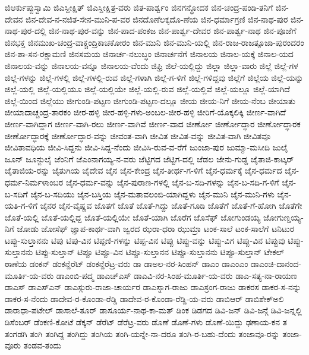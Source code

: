 {ಜಿಆರ್ಕುಪ್ಪುಸ್ವಾಮಿ
ಜಿಎಸ್ದೀಕ್ಷಿತ್
ಜಿಎಸ್ದೀಕ್ಷಿತ್ರ-ವರು
ಜಿತ-ಪಾರ್ಶ್ವಂ
ಜಿನಗನ್ಧೋದಕ
ಜಿನ-ಚಂದ್ರ-ಪಂಡಿ-ತನಿಗೆ
ಜಿನ-ದೇವನ
ಜಿನ-ದೇವ-ನ-ನಜಿತ-ಸೇನ-ಮುನಿ-ಪ-ವರ
ಜಿನದೊಣೆಲಕ್ಕದೊ-ಣೆಯ
ಜಿನ-ಧರ್ಮಾಗ್ರಣಿ
ಜಿನ-ನಾಥ-ಪುರ
ಜಿನ-ನಾಥ-ಪುರ-ದಲ್ಲಿ
ಜಿನ-ನಾಥ-ಪುರ-ವನ್ನು
ಜಿನ-ಪಾದ-ಪಂಕಜ
ಜಿನ-ಪಾರ್ಶ್ವ-ದೇವರ
ಜಿನ-ಪಾರ್ಶ್ವ-ನಾಥ
ಜಿನ-ಪೂಜೆಗೆ
ಜಿನಭಕ್ತ
ಜಿನಮುಖ-ಚಂದ್ರ-ವಾಕ್ಚಂದ್ರಿಕಾಚಕೋರಂ
ಜಿನ-ಮುನಿ
ಜಿನ-ಮುನಿ-ಯಲ್ಲಿ
ಜಿನ-ರಾಜ-ರಾಜತ್ಪೂಜಾ-ಪುರಂದರಂ
ಜಿನ-ಶಾ-ಸನ-ರಕ್ಷಾಮಣಿ
ಜಿನಸಮಯ
ಜಿನಾರ್ಚ-ನಲುಬ್ಧಂ
ಜಿನಾರ್ಚನೆಗೆ
ಜಿನಾಲಯ
ಜಿನಾಲ-ಯಕ್ಕೆ
ಜಿನಾಲ-ಯದ
ಜಿನಾಲಯ-ವನ್ನು
ಜಿನಾಲಯ-ವನ್ನೂ
ಜಿನಾಲಯ-ವೆಂದು
ಜಿಫ್ರಿ
ಜಿಲೆ-ಯಲ್ಲಿದ್ದು
ಜಿಲ್ಲಾ
ಜಿಲ್ಲಾ-ವಾರು
ಜಿಲ್ಲೆ
ಜಿಲ್ಲೆ-ಗಳ
ಜಿಲ್ಲೆ-ಗಳನ್ನು
ಜಿಲ್ಲೆ-ಗಳಲ್ಲಿ
ಜಿಲ್ಲೆ-ಗಳಲ್ಲಿ-ರುವ
ಜಿಲ್ಲೆ-ಗಳಾಗಿ
ಜಿಲ್ಲೆ-ಗ-ಳಿಗೆ
ಜಿಲ್ಲೆ-ಗಳಿದ್ದವು
ಜಿಲ್ಲೆಗೆ
ಜಿಲ್ಲೆಯ
ಜಿಲ್ಲೆ-ಯನ್ನು
ಜಿಲ್ಲೆ-ಯಲ್ಲಿ
ಜಿಲ್ಲೆ-ಯಲ್ಲಿಯೂ
ಜಿಲ್ಲೆ-ಯಲ್ಲಿಯೇ
ಜಿಲ್ಲೆ-ಯಲ್ಲಿ-ರುವ
ಜಿಲ್ಲೆ-ಯಲ್ಲಿವೆ
ಜಿಲ್ಲೆ-ಯಲ್ಲೂ
ಜಿಲ್ಲೆ-ಯಾಗಿದೆ
ಜಿಲ್ಲೆ-ಯಿಂದ
ಜಿಲ್ಲೆಯು
ಜೀಗುಂಡಿ-ಪಟ್ಟಣ
ಜೀಗುಂಡಿ-ಪಟ್ಟಣ-ದಲ್ಲೂ
ಜೀಯ
ಜೀಯ-ನಿಗೆ
ಜೀಯ-ನೆಂಬ
ಜೀಯಾತು
ಜೀಯಾದಾಚ್ಚಂದ್ರ-ತಾರಕಂ
ಜೀರ-ಹಳ್ಳಿ
ಜೀರ-ಹಳ್ಳಿ-ಗಳು-ಅಂಬಲ-ಜೀರ-ಹಳ್ಳಿ
ಜೀರಿಗೆ-ಯೊಕ್ಕಲಿಕ್ಕಿ
ಜೀರ್ಣ-ವಾಗಿದೆ
ಜೀರ್ಣ-ವಾಗಿದ್ದಾಗ
ಜೀರ್ಣ-ವಾಗಿ-ರಲು
ಜೀರ್ಣ-ವಾಗಿವೆ
ಜೀರ್ಣ-ವಾದ
ಜೀರ್ಣೋ
ಜೀರ್ಣೋದ್ಧಾರ
ಜೀರ್ಣೋದ್ಧಾರಕ
ಜೀರ್ಣೋದ್ಧಾರಕ್ಕೆ
ಜೀರ್ಣೋದ್ಧಾರ-ವನ್ನು
ಜೀವಂತ-ವಾಗಿ
ಜೀವಿತ
ಜೀವಿತ-ವನ್ನು
ಜೀವಿತ-ವಾಗಿ
ಜೀವಿತವೂ
ಜೀವಿತಾವಧಿಯ
ಜೀವಿ-ಸಿದ್ದನು
ಜೀವಿ-ಸಿದ್ದ-ನೆಂದು
ಜೀವಿಸಿ-ರುವ-ವ-ರೆಗೆ
ಜುಂಜಾ-ಪುರ
ಜುಮ್ಮಾ-ಮಸೀದಿ
ಜುಲೈ
ಜೂನ್
ಜೂನ್ಜುಲೈ
ಜೆಂನಿಗೆ
ಜೆಎಂನಾಗಯ್ಯ-ನ-ವರು
ಜೆಟ್ಟಿಗದ
ಜೆಟ್ಟಿಗ-ದಲ್ಲಿ
ಜೆಡಲ
ಜೇನು-ಗುಡ್ಡ
ಜೈತಾಜಿ-ಕಾಟ್ಕರ್
ಜೈತಾಜಿಯ-ರನ್ನು
ಜೈತುಗಿಯ
ಜೈದೇವ
ಜೈನ
ಜೈನ-ಕೇಂದ್ರ
ಜೈನ-ತೀರ್ಥ-ಗ-ಳಿಗೆ
ಜೈನ-ಧರ್ಮಕ್ಕೆ
ಜೈನ-ಧರ್ಮದ
ಜೈನ-ಧರ್ಮ-ನಿರ್ಮಳಾಂಬರ
ಜೈನ-ಧರ್ಮ-ವನ್ನು
ಜೈನ-ಪುರಾಣ-ಗಳಲ್ಲಿ
ಜೈನ-ಬ-ಸದಿ-ಗಳನ್ನು
ಜೈನ-ಬ-ಸದಿ-ಗ-ಳಿಗೆ
ಜೈನ-ಬ-ಸದಿಗೆ
ಜೈನ-ಬ-ಸದಿಯು
ಜೈನ-ಬಸ್ತಿಯ
ಜೈನ-ಮತಾವಲಂಬಿ-ಯಾಗಿದ್ದಳು
ಜೈನ-ಮುನಿ
ಜೈನ-ಮುನಿ-ಗಳು
ಜೈನ-ಯತಿ-ಗ-ಳಿಗೆ
ಜೈನರ
ಜೈನ-ವೈಷ್ಣವ
ಜೊತಗೆ
ಜೊತೆ
ಜೊತೆ-ಗಿದ್ದು
ಜೊತೆ-ಗೂಡಿ
ಜೊತೆಗೆ
ಜೊತೆ-ಗೆ-ಹೋಗಿ
ಜೊತೆಗೇ
ಜೊತೆ-ಯಲ್ಲಿ
ಜೊತೆ-ಯಲ್ಲಿದ್ದ
ಜೊತೆ-ಯಲ್ಲಿಯೇ
ಜೊತೆ-ಯಾಗಿ
ಜೊರೆಗ
ಜೊಸೆಫ್
ಜೋಗುಂಡಯ್ಯ
ಜೋಗುಣ್ಡಯ್ಯ-ನಿಗೆ
ಜೋಡು
ಜೋಸೆಫ್
ಜ್ಞಾಪ-ಕಾರ್ಥ-ವಾಗಿ
ಜ್ವರದ
ಝರಾ-ಧರಾ
ಝುಮ್ರಾ
ಟಂಕ-ಸಾಲೆ
ಟಂಕ-ಸಾಲೆಗೆ
ಟನಿಟುರ
ಟಪ್ಪು-ಸುಲ್ತಾನನು
ಟಿಪು
ಟಿಪು-ವಿನ
ಟಿಪ್ಪಣಿ-ಗಳನ್ನು
ಟಿಪ್ಪ-ವಿನ
ಟಿಪ್ಪು
ಟಿಪ್ಪು-ವನ್ನು
ಟಿಪ್ಪು-ವಿಗ
ಟಿಪ್ಪು-ವಿನ
ಟಿಪ್ಪುವು
ಟಿಪ್ಪು-ಸುಲ್ತಾನನು
ಟಿಪ್ಪು-ಸುಲ್ತಾನ್
ಟಿಪ್ಪೂ
ಟಿಪ್ಪೂ-ವಿನ
ಟಿಪ್ಪೂ-ಸುಲ್ತಾನನ
ಟಿಪ್ಪೂ-ಸುಲ್ತಾನನು
ಟಿಪ್ಪೂ-ಸುಲ್ತಾನ್
ಟೇಕಲ್
ಠಾಣೆಯ
ಡಂಕನ್
ಡಂಕನ್ಡೆರೆಟ್
ಡಂಕನ್ಡೆರೆಟ್ರ-ವರು
ಡಾ
ಡಾಅಲ-ನರ-ಸಿಂಹನ್
ಡಾಎಂ
ಡಾಎಂಎಂ
ಡಾಎಂಚಿ-ದಾನಂದ-ಮೂರ್ತಿ-ಯ-ವರು
ಡಾಎಂಬಿ-ಪದ್ಮ
ಡಾಎಚ್ಎಸ್
ಡಾಎವಿ-ನರ-ಸಿಂಹ-ಮೂರ್ತಿ-ಯ-ವರು
ಡಾಎ-ಸತ್ಯ-ನಾ-ರಾಯಣ
ಡಾಎಸ್
ಡಾಎಸ್ಎನ್
ಡಾಎಸ್ಗುರು-ರಾಜಾ-ಚಾರ್ಯರ
ಡಾಎಸ್ನಾಗ-ರಾಜು
ಡಾಎಸ್ರಂಗ-ರಾಜು
ಡಾಕರಸ
ಡಾಕರ-ಸ-ನನ್ನು
ಡಾಕರ-ಸ-ನೆಂದು
ಡಾದೇವ-ರ-ಕೊಂಡಾ-ರೆಡ್ಡಿ
ಡಾದೇವ-ರ-ಕೊಂಡಾ-ರೆಡ್ಡಿ-ಯ-ವರು
ಡಾಬಿಆರ್
ಡಾಬಿಶೇಕ್ಅಲಿ
ಡಾರಾಧಾ-ಪಟೇಲ್
ಡಾಸಾಲೆ-ತೂರ್
ಡಾಸೂರ್ಯ-ನಾಥ-ಕಾ-ಮತ್
ಡಿಂಕ
ಡಿಡಗದ
ಡಿವಿ-ಜನ್
ಡಿವಿ-ಜನ್ಗೆ
ಡಿವಿ-ಜನ್ನಲ್ಲಿ
ಡಿಸೆಂಬರ್
ಡೆಂಕಣಿ-ಕೋಟೆ
ಡೆಕ್ಕನ್
ಡೆರೆಟ್
ಡೆರೆಟ್ರ-ವರು
ಡೊಣೆ
ಡೊಣೆ-ಗಳು
ಡೊಣೆ-ಯಿದ್ದು
ಢಣಾಯ-ಕನ
ತ
ತಂಗಡಗಿ
ತಂಗಿ
ತಂಗಿದ್ದ
ತಂಗಿದ್ದು
ತಂಗಿಯ
ತಂಗಿ-ಯನ್ನೇ-ನಾ-ದರೂ
ತಂಗಿ-ರ-ಬಹು-ದೆಂದು
ತಂಜಾವೂ-ರನ್ನು
ತಂಜಾ-ವೂರು
ತಂಡವ-ತಂದು
}
